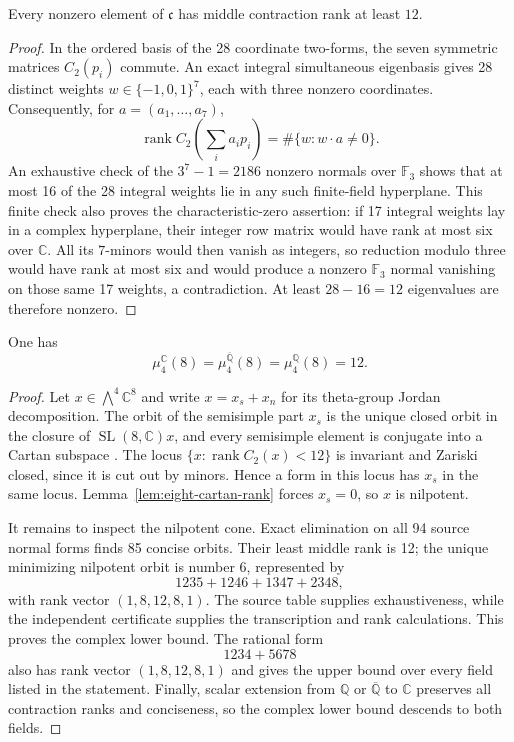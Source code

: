 \begin{lemma}
\label{lem:eight-cartan-rank}
Every nonzero element of $\mathfrak c$ has middle contraction rank at least
$12$.
\end{lemma}

\begin{proof}
In the ordered basis of the 28 coordinate two-forms, the seven symmetric
matrices $C_2(p_i)$ commute.  An exact integral simultaneous eigenbasis gives
28 distinct weights $w\in\{-1,0,1\}^7$, each with three nonzero coordinates.
Consequently, for $a=(a_1,\ldots,a_7)$,
\[
  \operatorname{rank}C_2\!\left(\sum_i a_ip_i\right)
  =\#\{w:w\mathbin{\cdot}a\ne0\}.
\]
An exhaustive check of the $3^7-1=2186$ nonzero normals over $\mathbb F_3$
shows that at most 16 of the 28 integral weights lie in any such finite-field
hyperplane.  This finite check also proves the characteristic-zero assertion:
if 17 integral weights lay in a complex hyperplane, their integer row matrix
would have rank at most six over $\mathbb C$.  All its $7$-minors would then
vanish as integers, so reduction modulo three would have rank at most six and
would produce a nonzero $\mathbb F_3$ normal vanishing on those same 17
weights, a contradiction.  At least $28-16=12$ eigenvalues are therefore
nonzero.
\end{proof}

\begin{theorem}
\label{thm:mu-four-eight}
One has
\[
  \mu_4^{\mathbb C}(8)
  =\mu_4^{\overline{\mathbb Q}}(8)
  =\mu_4^{\mathbb Q}(8)
  =12.
\]
\end{theorem}

\begin{proof}
Let $x\in\bigwedge^4\mathbb C^8$ and write $x=x_s+x_n$ for its theta-group
Jordan decomposition.  The orbit of the semisimple part $x_s$ is the unique
closed orbit in the closure of $\operatorname{SL}(8,\mathbb C)x$, and every
semisimple element is conjugate into a Cartan subspace
\cite{GalitskiTimashev1999Metabelian,Oeding2022Antonyan}.  The locus
$\{x:\operatorname{rank}C_2(x)<12\}$ is invariant and Zariski closed, since it
is cut out by minors.  Hence a form in this locus has $x_s$ in the same locus.
Lemma~\ref{lem:eight-cartan-rank} forces $x_s=0$, so $x$ is nilpotent.

It remains to inspect the nilpotent cone.  Exact elimination on all 94 source
normal forms finds 85 concise orbits.  Their least middle rank is 12; the
unique minimizing nilpotent orbit is number 6, represented by
\[
  1235+1246+1347+2348,
\]
with rank vector $(1,8,12,8,1)$.  The source table supplies exhaustiveness,
while the independent certificate supplies the transcription and rank
calculations.  This proves the complex lower bound.  The rational form
\[
  1234+5678
\]
also has rank vector $(1,8,12,8,1)$ and gives the upper bound over every field
listed in the statement.  Finally, scalar extension from $\mathbb Q$ or
$\overline{\mathbb Q}$ to $\mathbb C$ preserves all contraction ranks and
conciseness, so the complex lower bound descends to both fields.
\end{proof}

